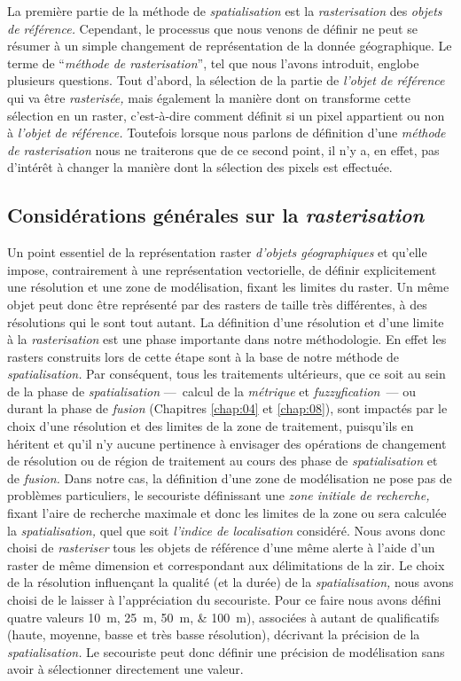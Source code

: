 La première partie de la méthode de \emph{spatialisation} est la
\emph{rasterisation} des \emph{objets de référence.} Cependant, le
processus que nous venons de définir ne peut se résumer à un simple
changement de représentation de la donnée géographique. Le terme de
\enquote{\emph{méthode de rasterisation}}, tel que nous l'avons
introduit, englobe plusieurs questions. Tout d'abord, la sélection de
la partie de \emph{l'objet de référence} qui va être
\emph{rasterisée,} mais également la manière dont on transforme cette
sélection en un raster, c'est-à-dire comment définit si un pixel
appartient ou non à \emph{l'objet de référence.} Toutefois lorsque
nous parlons de définition d'une \emph{méthode de rasterisation} nous
ne traiterons que de ce second point, il n'y a, en effet, pas
d’intérêt à changer la manière dont la sélection des pixels est
effectuée.

\subsection{Considérations générales sur la \emph{rasterisation}}

Un point essentiel de la représentation raster \emph{d'objets
  géographiques} et qu'elle impose, contrairement à une représentation
vectorielle, de définir explicitement une résolution et une zone de
modélisation, fixant les limites du raster. Un même objet peut donc
être représenté par des rasters de taille très différentes, à des
résolutions qui le sont tout autant. La définition d'une résolution et
d'une limite à la \emph{rasterisation} est une phase importante dans
notre méthodologie. En effet les rasters construits lors de cette
étape sont à la base de notre méthode de \emph{spatialisation.} Par
conséquent, tous les traitements ultérieurs, que ce soit au sein de la
phase de \emph{spatialisation} ---~calcul de la \emph{métrique} et
\emph{fuzzyfication}~--- ou durant la phase de \emph{fusion}
(Chapitres \ref{chap:04} et \ref{chap:08}), sont impactés par le choix
d'une résolution et des limites de la zone de traitement, puisqu'ils
en héritent et qu'il n'y aucune pertinence à envisager des opérations
de changement de résolution ou de région de traitement au cours des
phase de \emph{spatialisation} et de \emph{fusion.} Dans notre cas, la
définition d'une zone de modélisation ne pose pas de problèmes
particuliers, le secouriste définissant une \emph{zone initiale de
  recherche,} fixant l'aire de recherche maximale et donc les limites
de la zone ou sera calculée la \emph{spatialisation,} quel que soit
\emph{l'indice de localisation} considéré. Nous avons donc choisi de
\emph{rasteriser} tous les objets de référence d'une même alerte à
l'aide d'un raster de même dimension et correspondant aux
délimitations de la \ac{zir}. Le choix de la résolution influençant la
qualité (et la durée) de la \emph{spatialisation,} nous avons choisi
de le laisser à l'appréciation du secouriste. Pour ce faire nous avons
défini quatre valeurs \SIlist{10;25;50;100}{\meter}), associées à
autant de qualificatifs (haute, moyenne, basse et très basse
résolution), décrivant la précision de la \emph{spatialisation.} Le
secouriste peut donc définir une précision de modélisation sans avoir
à sélectionner directement une valeur.

